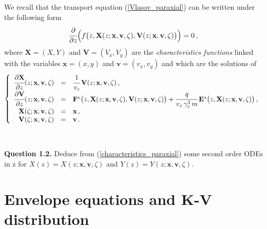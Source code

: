 \documentclass[10pt]{article}
\newcommand{\D}{{\partial}}
\begin{document}
\indent We recall that the transport equation (\ref{Vlasov_paraxial}) can be written under the following form
\begin{equation}
\cfrac{\D}{\D z} \Big( f\big( z, \mathbf{X}(z; \mathbf{x},\mathbf{v}, \zeta), \mathbf{V}(z; \mathbf{x},\mathbf{v}, \zeta) \big) \Big) = 0 \, ,
\end{equation}
where $\mathbf{X} = (X,Y)$ and $\mathbf{V} = (V_{x},V_{y})$ are the \textit{characteristics functions} linked with the variables $\mathbf{x} = (x,y)$ and $\mathbf{v} = (v_{x},v_{y})$ and which are the solutions of
\begin{equation} \label{characteristics_paraxial}
\left\{
\begin{array}{rcl}
\cfrac{\D \mathbf{X}}{\D z}(z;\mathbf{x},\mathbf{v},\zeta) &=& \cfrac{1}{v_{z}} \, \mathbf{V}(z;\mathbf{x},\mathbf{v},\zeta) \, , \\
\cfrac{\D \mathbf{V}}{\D z}(z;\mathbf{x},\mathbf{v},\zeta) &=& \mathbf{F}^{e}\big(z,\mathbf{X}(z;\mathbf{x},\mathbf{v},\zeta),\mathbf{V}(z;\mathbf{x},\mathbf{v},\zeta)\big) + \cfrac{q}{v_{z}\,\gamma_{z}^{3}\,m}\, \mathbf{E}^{s}\big(z,\mathbf{X}(z;\mathbf{x},\mathbf{v},\zeta)\big) \, , \\
\mathbf{X}(\zeta;\mathbf{x},\mathbf{v},\zeta) &=& \mathbf{x} \, , \\
\mathbf{V}(\zeta;\mathbf{x},\mathbf{v},\zeta) &=& \mathbf{v} \, .
\end{array}
\right.
\end{equation}

\textit{ \\ }

\begin{leftbar}
\textbf{Question 1.2.} Deduce from (\ref{characteristics_paraxial}) some second order ODEs in z for $X(z) = X(z;\mathbf{x},\mathbf{v},\zeta)$ and $Y(z) = Y(z;\mathbf{x},\mathbf{v},\zeta)$.
\end{leftbar}






\section{Envelope equations and K-V distribution}
\setcounter{equation}{0}
\end{document}

